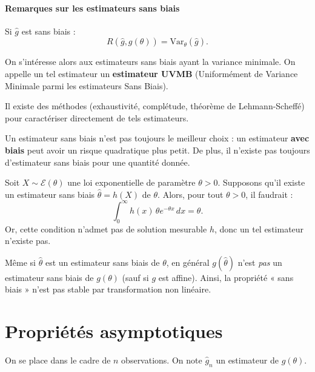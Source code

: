 \paragraph{Remarques sur les estimateurs sans biais}

Si $\hat{g}$ est sans biais :
\[
R(\hat{g}, g(\theta)) = \mathrm{Var}_\theta(\hat{g}).
\]

On s'intéresse alors aux estimateurs sans biais ayant la variance minimale.  
On appelle un tel estimateur un \textbf{estimateur UVMB} (Uniformément de Variance Minimale parmi les estimateurs Sans Biais).  

Il existe des méthodes (exhaustivité, complétude, théorème de Lehmann-Scheffé) pour caractériser directement de tels estimateurs.

\begin{remarque}
Un estimateur sans biais n'est pas toujours le meilleur choix :  
un estimateur \textbf{avec biais} peut avoir un risque quadratique plus petit.  
De plus, il n'existe pas toujours d'estimateur sans biais pour une quantité donnée.
\end{remarque}

\begin{exemple}
Soit $X \sim \mathcal{E}(\theta)$ une loi exponentielle de paramètre $\theta > 0$.  
Supposons qu'il existe un estimateur sans biais $\hat{\theta} = h(X)$ de $\theta$.  
Alors, pour tout $\theta > 0$, il faudrait :
\[
\int_0^\infty h(x)\, \theta e^{-\theta x}\, dx = \theta.
\]
Or, cette condition n'admet pas de solution mesurable $h$, donc un tel estimateur n'existe pas.
\end{exemple}

\begin{remarque}
Même si $\hat{\theta}$ est un estimateur sans biais de $\theta$, en général $g(\hat{\theta})$ n'est \emph{pas} un estimateur sans biais de $g(\theta)$ (sauf si $g$ est affine).  
Ainsi, la propriété « sans biais » n'est pas stable par transformation non linéaire.
\end{remarque}





\newpage

\section{Propriétés asymptotiques}

On se place dans le cadre de $n$ observations.  
On note $\hat{g}_n$ un estimateur de $g(\theta)$.

